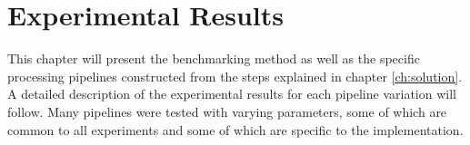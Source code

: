 \chapter{Experimental Results}\label{ch:results}

This chapter will present the benchmarking method as well as the specific
processing pipelines constructed from the steps explained in chapter
\ref{ch:solution}. A detailed description of the experimental results for each
pipeline variation will follow. Many pipelines were tested with varying
parameters, some of which are common to all experiments and some of which are
specific to the implementation.



